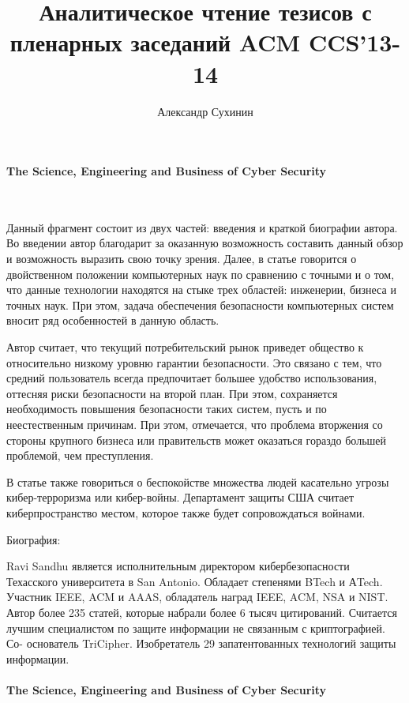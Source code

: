 \documentclass[10pt,a4paper]{article}
\author{Александр Сухинин}
\title{Аналитическое чтение тезисов с пленарных заседаний ACM CCS'13-14}
\begin{document}
\maketitle

\paragraph{The Science, Engineering and Business of Cyber Security}
~

Данный фрагмент состоит из двух частей: введения и краткой биографии автора. 
Во введении автор благодарит за оказанную возможность составить данный обзор и возможность выразить свою точку зрения. Далее, в статье говорится о двойственном положении компьютерных наук по сравнению с точными и о том, что данные технологии находятся на стыке трех областей: инженерии, бизнеса и точных наук. При этом, задача обеспечения безопасности компьютерных систем вносит ряд особенностей в данную область.

Автор считает, что текущий потребительский рынок приведет общество к относительно низкому уровню гарантии безопасности. Это связано с тем, что средний пользователь всегда предпочитает большее удобство использования, оттесняя риски безопасности на второй план. При этом, сохраняется необходимость повышения безопасности таких систем, пусть и по неестественным причинам. При этом, отмечается, что проблема вторжения со стороны крупного бизнеса или правительств может оказаться гораздо большей проблемой, чем преступления.

В статье также говориться о беспокойстве множества людей касательно угрозы кибер-терроризма или кибер-войны. Департамент защиты США считает киберпространство местом, которое также будет сопровождаться войнами.

Биография:

Ravi Sandhu является исполнительным директором кибербезопасности Техасского университета в San Antonio. Обладает степенями BTech и АTech. Участник IEEE, ACM и AAAS, обладатель наград IEEE, ACM, NSA и NIST. Автор более 235 статей, которые набрали более 6 тысяч цитирований. Считается лучшим специалистом по защите информации не связанным с криптографией. Со- основатель TriCipher. Изобретатель 29 запатентованных технологий защиты информации.

\paragraph{The Science, Engineering and Business of Cyber Security}
~
\end{document}
